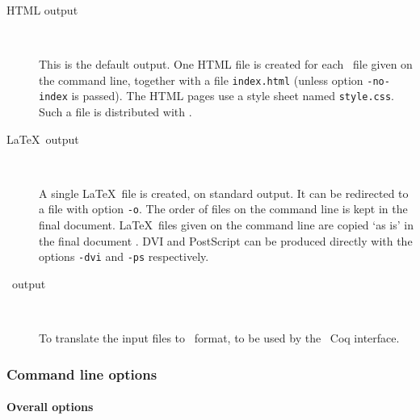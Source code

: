 \begin{description}
\item[HTML output] ~\par
  This is the default output.
  One HTML file is created for each \Coq\ file given on the command line,
  together with a file \texttt{index.html} (unless option
  \texttt{-no-index} is passed). The HTML pages use a style sheet
  named \texttt{style.css}. Such a file is distributed with \coqdoc.

\item[\LaTeX\ output] ~\par
  A single \LaTeX\ file is created, on standard output. It can be
  redirected to a file with option \texttt{-o}. 
  The order of files on the command line is kept in the final
  document. \LaTeX\ files given on the command line are copied `as is'
  in the final document .
  DVI and PostScript can be produced directly with the options
  \texttt{-dvi} and \texttt{-ps} respectively.

\item[\texmacs\ output] ~\par
  To translate the input files to \texmacs\ format, to be used by
  the \texmacs\ Coq interface.
\end{description}


\subsubsection*{Command line options}


\paragraph{Overall options}

